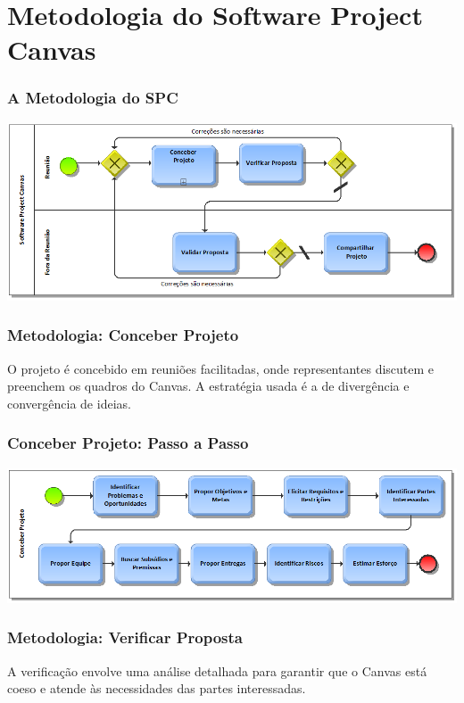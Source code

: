 \documentclass[aspectratio=169]{beamer}
\begin{document}
\section{Metodologia do Software Project Canvas}

\begin{frame}

\frametitle{A Metodologia do SPC}

\centering
\includegraphics[width=\textwidth]{imagens/Software Project Canvas - 4 pessos.adf.png}
    
\end{frame}

\begin{frame}
\frametitle{Metodologia: Conceber Projeto}
O projeto é concebido em reuniões facilitadas, onde representantes discutem e preenchem os quadros do Canvas. A estratégia usada é a de divergência e convergência de ideias.
\end{frame}

\begin{frame}
\frametitle{Conceber Projeto: Passo a Passo}
    \centering
\includegraphics[width=\textwidth]{imagens/Conceber Projeto do Software Project Canvas.png}
\end{frame}

\begin{frame}
\frametitle{Metodologia: Verificar Proposta}
A verificação envolve uma análise detalhada para garantir que o Canvas está coeso e atende às necessidades das partes interessadas.
\end{frame}
\end{document}
